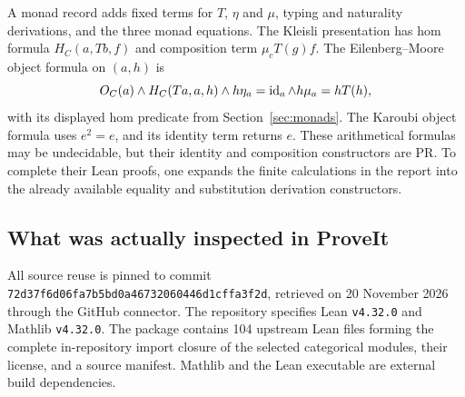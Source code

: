 A monad record adds fixed terms for $T$, $\eta$ and $\mu$, typing and
naturality derivations, and the three monad equations. The Kleisli
presentation has hom formula $H_C(a,Tb,f)$ and composition term
$\mu_cT(g)f$. The Eilenberg--Moore object formula on $(a,h)$ is
\[
 O_C(a)\wedge H_C(Ta,a,h)\wedge h\eta_a=\operatorname{id}_a
                         \wedge h\mu_a=hT(h),
\]
with its displayed hom predicate from Section~\ref{sec:monads}.
The Karoubi object formula uses $e^2=e$, and its identity term returns
$e$. These arithmetical formulas may be undecidable, but their identity
and composition constructors are PR. To complete their Lean proofs,
one expands the finite calculations in the report into the already
available equality and substitution derivation constructors.

\subsection{What was actually inspected in ProveIt}
All source reuse is pinned to commit
\texttt{72d37f6d06fa7b5bd0a46732060446d1cffa3f2d}, retrieved on
20 November 2026 through the GitHub connector. The repository specifies
Lean \texttt{v4.32.0} and Mathlib \texttt{v4.32.0}.
The package contains 104 upstream Lean files forming the complete
in-repository import closure of the selected categorical modules, their
license, and a source manifest. Mathlib and the Lean executable are
external build dependencies.

